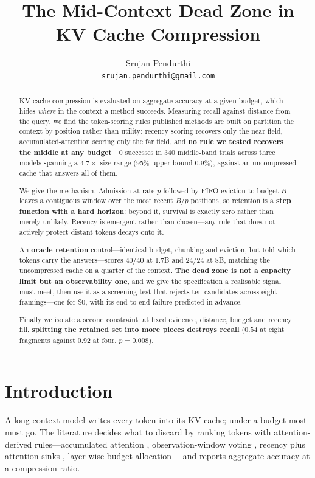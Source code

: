 \documentclass[10pt]{article}
\title{The Mid-Context Dead Zone in KV Cache Compression}
\author{Srujan Pendurthi\\\texttt{srujan.pendurthi@gmail.com}}
\date{}
\begin{document}
\maketitle

\begin{abstract}
KV cache compression is evaluated on aggregate accuracy at a given budget,
which hides \emph{where} in the context a method succeeds. Measuring recall
against distance from the query, we find the token-scoring rules published
methods are built on partition the context by position rather than utility:
recency scoring recovers only the near field, accumulated-attention scoring
only the far field, and \textbf{no rule we tested recovers the middle at any
budget}---0 successes in 340 middle-band trials across three models spanning a
$4.7\times$ size range (95\% upper bound 0.9\%), against an uncompressed cache
that answers all of them.

We give the mechanism. Admission at rate $p$ followed by FIFO eviction to
budget $B$ leaves a contiguous window over the most recent $B/p$ positions, so
retention is a \textbf{step function with a hard horizon}: beyond it, survival
is exactly zero rather than merely unlikely. Recency is emergent rather than
chosen---any rule that does not actively protect distant tokens decays onto it.

An \textbf{oracle retention} control---identical budget, chunking and eviction,
but told which tokens carry the answers---scores $40/40$ at 1.7B and $24/24$ at
8B, matching the uncompressed cache on a quarter of the context. \textbf{The
dead zone is not a capacity limit but an observability one}, and we give the
specification a realisable signal must meet, then use it as a screening test
that rejects ten candidates across eight framings---one for \$0,
with its end-to-end failure predicted in advance.

Finally we isolate a second constraint: at fixed evidence, distance, budget and
recency fill, \textbf{splitting the retained set into more pieces destroys
recall} ($0.54$ at eight fragments against $0.92$ at four, $p{=}0.008$).
\end{abstract}

\section{Introduction}

A long-context model writes every token into its KV cache; under a budget most
must go. The literature decides what to discard by ranking tokens with
attention-derived rules---accumulated attention \citep{zhang2023h2o},
observation-window voting \citep{li2024snapkv}, recency plus attention sinks
\citep{xiao2024streamingllm}, layer-wise budget allocation
\citep{cai2024pyramidkv,feng2024adakv}---and reports aggregate accuracy at a
compression ratio.
\end{document}
